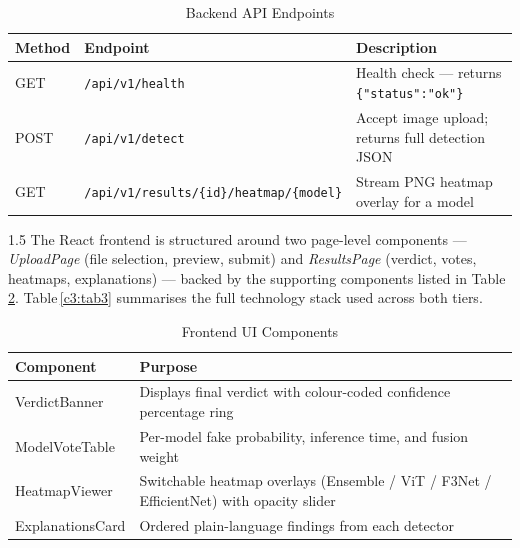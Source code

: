 \renewcommand{\arraystretch}{1.3}
\begin{table}[htbp]
  \centering
  \begin{tabular}{|l|l|p{5.5cm}|}
  \hline
  \textbf{Method} & \textbf{Endpoint} & \textbf{Description} \\
  \hline
  GET  & \texttt{/api/v1/health}  & Health check --- returns \texttt{\{"status":"ok"\}} \\
  \hline
  POST & \texttt{/api/v1/detect}  & Accept image upload; returns full detection JSON \\
  \hline
  GET  & \texttt{/api/v1/results/\{id\}/heatmap/\{model\}} & Stream PNG heatmap overlay for a model \\
  \hline
  \end{tabular}
  \caption{Backend API Endpoints}
  \label{c3:tab1}
\end{table}

\begin{spacing}{1.5}
The React frontend is structured around two page-level components --- \textit{UploadPage} (file selection, preview, submit) and \textit{ResultsPage} (verdict, votes, heatmaps, explanations) --- backed by the supporting components listed in Table\,\ref{c3:tab2}. Table\,\ref{c3:tab3} summarises the full technology stack used across both tiers.
\end{spacing}

\renewcommand{\arraystretch}{1.3}
\begin{table}[htbp]
  \centering
  \begin{tabular}{|l|p{7.5cm}|}
  \hline
  \textbf{Component} & \textbf{Purpose} \\
  \hline
  VerdictBanner    & Displays final verdict with colour-coded confidence percentage ring \\
  \hline
  ModelVoteTable   & Per-model fake probability, inference time, and fusion weight \\
  \hline
  HeatmapViewer    & Switchable heatmap overlays (Ensemble / ViT / F3Net / EfficientNet) with opacity slider \\
  \hline
  ExplanationsCard & Ordered plain-language findings from each detector \\
  \hline
  \end{tabular}
  \caption{Frontend UI Components}
  \label{c3:tab2}
\end{table}

